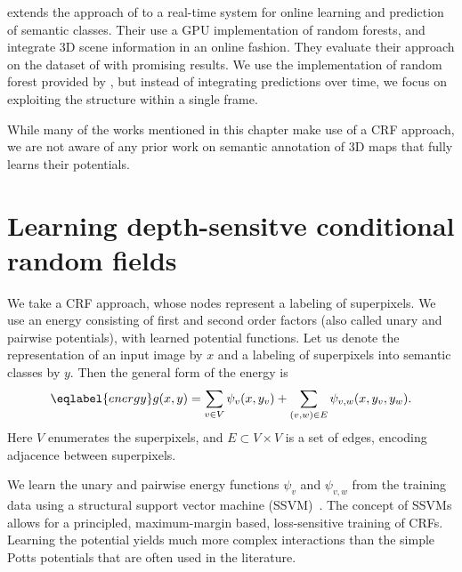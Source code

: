 \citet{stueckler2013} extends the approach of \citet{stuckler2012semantic} to
a real-time system for online learning and prediction of semantic classes. Their
use a GPU implementation of random forests, and integrate 3D scene information
in an online fashion. They evaluate their approach on the dataset of
\citet{SilbermanECCV12} with promising results.
We use the implementation of random forest provided by
\citet{stueckler2013}, but instead of integrating predictions over time, we
focus on exploiting the structure within a single frame.

While many of the works mentioned in this chapter make use of a CRF
approach, we are not aware of any prior work on semantic annotation of 3D maps
that fully learns their potentials.



\section{Learning depth-sensitve conditional random fields}
We take a CRF approach, whose nodes represent a labeling of
superpixels.  We use an energy consisting of first and second order factors
(also called unary and pairwise potentials), with learned potential functions.
Let us denote the representation of an input image by $x$ and a labeling of
superpixels into semantic classes by $y$.  Then the general form of the energy is
\begin{equation}\eqlabel{energy}
    g(x, y) = \sum_{v \in V} \psi_v(x, y_v) + \sum_{(v, w) \in E} \psi_{v,w}(x, y_{v}, y_{w}).
\end{equation}
Here $V$ enumerates the superpixels, and $E\subset V \times V$ is a set of
edges, encoding adjacence between superpixels.

We learn the unary and pairwise energy functions $\psi_v$ and $\psi_{v, w}$ from the training data
using a structural support vector machine (SSVM)~\citep{joachims2009cutting}. 
The concept of SSVMs allows for a principled,
maximum-margin based, loss-sensitive training of CRFs. Learning the potential yields much
more complex interactions than the simple Potts potentials that are often used in the literature.

